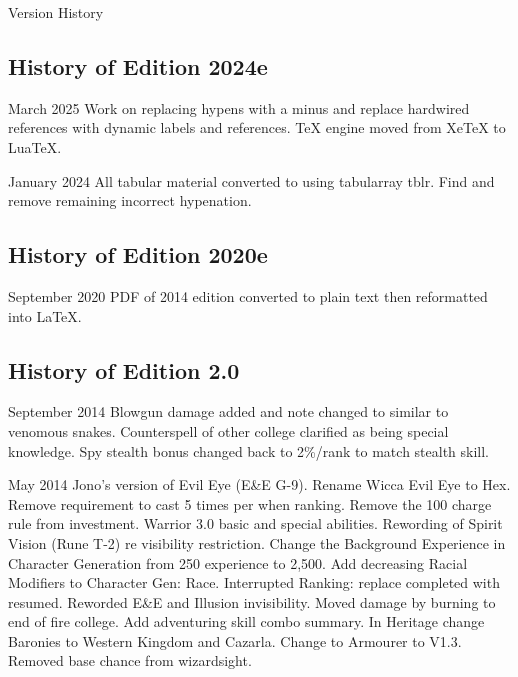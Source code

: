 \begin{Chapter}{Version History}

\subsection{History of Edition 2024e}

\begin{Description}

\item[March 2025] Work on replacing hypens with a minus and
  replace hardwired references with dynamic labels and
  references.  \TeX{} engine moved from Xe\TeX{} to Lua\TeX{}.
    
\item[January 2024] All tabular material converted to using
  tabularray tblr.  Find and remove remaining incorrect hypenation.

\subsection{History of Edition 2020e}

\item[September 2020] PDF of 2014 edition converted to plain
text then reformatted into \LaTeX.

\end{Description}

\subsection{History of Edition 2.0}

\begin{Description}

\item[September 2014] Blowgun damage added and note changed to similar
  to venomous snakes.  Counterspell of other college clarified as
  being special knowledge.  Spy stealth bonus changed back to 2\%/rank
  to match stealth skill.

\item[May 2014] Jono's version of Evil Eye (E\&E G-9).  Rename Wicca
  Evil Eye to Hex.  Remove requirement to cast 5 times per when
  ranking.  Remove the 100 charge rule from investment.  Warrior 3.0
  basic and special abilities.  Rewording of Spirit Vision (Rune T-2)
  re visibility restriction.  Change the Background Experience in
  Character Generation from 250 experience to 2,500.  Add decreasing
  Racial Modifiers to Character Gen: Race.  Interrupted Ranking:
  replace completed with resumed.  Reworded E\&E and Illusion
  invisibility.  Moved damage by burning to end of fire college.  Add
  adventuring skill combo summary.  In Heritage change Baronies to
  Western Kingdom and Cazarla.  Change to Armourer to V1.3.  Removed
  base chance from wizardsight.


\end{Description}
\end{Chapter}
